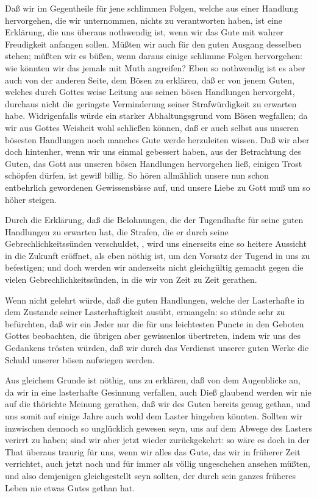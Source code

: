 \begin{aufza}
\item Daß wir im Gegentheile für jene schlimmen Folgen, welche aus einer Handlung hervorgehen, die wir  unternommen, nichts zu verantworten haben, ist eine Erklärung, die uns überaus nothwendig ist, wenn wir das Gute mit wahrer Freudigkeit anfangen sollen. Müßten wir auch für den guten Ausgang desselben stehen; müßten wir es büßen, wenn daraus einige schlimme Folgen hervorgehen: wie könnten wir das jemals mit Muth angreifen? Eben so nothwendig ist es aber auch von der anderen Seite, dem Bösen zu erklären, daß er von jenem Guten, welches durch Gottes weise Leitung aus seinen bösen Handlungen hervorgeht, durchaus nicht die geringste Verminderung seiner Strafwürdigkeit zu erwarten habe. Widrigenfalls würde ein starker Abhaltungsgrund vom Bösen wegfallen; da wir aus Gottes Weisheit wohl schließen können, daß er auch selbst aus unseren bösesten Handlungen noch manches Gute werde herzuleiten wissen. Daß wir aber doch hintenher, wenn wir uns einmal gebessert haben, aus der Betrachtung des Guten, das Gott aus unseren bösen Handlungen hervorgehen ließ, einigen Trost schöpfen dürfen, ist gewiß billig. So hören allmählich unsere nun schon entbehrlich gewordenen Gewissensbisse auf, und unsere Liebe zu Gott muß um so höher steigen.
\item Durch die Erklärung, daß die Belohnungen, die der Tugendhafte für seine guten Handlungen zu erwarten hat, die Strafen, die er durch seine Gebrechlichkeitssünden ver\-schul\-det, , wird uns einerseits eine so heitere Aussicht in die Zukunft eröffnet, als eben nöthig ist, um den Vorsatz der Tugend in uns zu befestigen; und doch werden wir anderseits nicht gleichgültig gemacht gegen die vielen Gebrechlichkeitssünden, in die wir von Zeit zu Zeit gerathen.
\item Wenn nicht gelehrt würde, daß die guten Handlungen, welche der Lasterhafte in dem Zustande seiner Lasterhaftigkeit ausübt,  ermangeln: so stünde sehr zu befürchten, daß wir ein Jeder nur die für uns leichtesten Puncte in den Geboten Gottes beobachten, die übrigen aber gewissenlos übertreten, indem wir uns des Gedankens trösten würden, daß wir durch das Verdienst unserer guten Werke die Schuld unserer bösen aufwiegen werden.
\item Aus gleichem Grunde ist nöthig, uns zu erklären, daß von dem Augenblicke an, da wir in eine lasterhafte Gesinnung verfallen, auch  Dieß glaubend werden wir nie auf die thörichte Meinung gerathen, daß wir des Guten bereits genug gethan, und uns somit auf einige Jahre auch wohl dem Laster hingeben könnten. Sollten wir inzwischen dennoch so unglücklich gewesen seyn, uns auf dem Abwege des Lasters verirrt zu haben; sind wir aber jetzt wieder zurückgekehrt: so wäre es doch in der That überaus traurig für uns, wenn wir alles das Gute, das wir in früherer Zeit verrichtet, auch jetzt noch und für immer als völlig ungeschehen ansehen müßten, und also demjenigen gleichgestellt seyn sollten, der durch sein ganzes früheres Leben nie etwas Gutes gethan hat.

\end{aufza}
